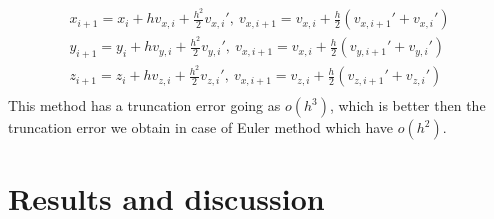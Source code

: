 \documentclass[10pt]{article}
\begin{document}
\begin{equation}
\begin{aligned} 
x_{i+1}=x_{i}+hv_{x,i}+\frac{h^2}{2}v_{x,i}',\ 
v_{x,i+1}=v_{x,i}+\frac{h}{2}(v_{x,i+1}'+v_{x,i}')\\
y_{i+1}=y_{i}+hv_{y,i}+\frac{h^2}{2}v_{y,i}',\ 
v_{x,i+1}=v_{x,i}+\frac{h}{2}(v_{y,i+1}'+v_{y,i}')\\
z_{i+1}=z_{i}+hv_{z,i}+\frac{h^2}{2}v_{z,i}',\ 
v_{x,i+1}=v_{z,i}+\frac{h}{2}(v_{z,i+1}'+v_{z,i}')\\
\end{aligned}
\end{equation}
This method has a truncation error going as $o(h^3)$, which is better then the truncation error we obtain in case of Euler method which have $o(h^2)$.

\section{Results and discussion}\label{results}
\end{document}
